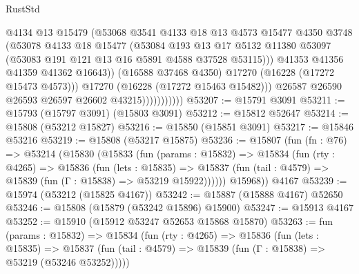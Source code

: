 \begin{lexlean}{RustStd}
\begin{coremodule}
                                @4134
                                @13
                                @15479
                                (@53068
                                  @3541
                                  @4133
                                  @18
                                  @13
                                  @4573
                                  @15477
                                  @4350
                                  @3748
                                  (@53078
                                    @4133
                                    @18
                                    @15477
                                    (@53084
                                      @193
                                      @13
                                      @17
                                      @5132
                                      @11380
                                      @53097
                                      (@53083 @191 @121 @13 @16 @5891 @4588 @37528 @53115)))
                                  @41353
                                  @41356
                                  @41359
                                  @41362
                                  @16643))
                              (@16588 @37468 @4350)
                              @17270
                              (@16228 (@17272 @15473 @4573)))
                            @17270
                            (@16228 (@17272 @15463 @15482)))
                          @26587
                          @26590
                          @26593
                          @26597
                          @26602
                          @43215)))))))))))
@53207 := @15791 @3091
@53211 := @15793 (@15797 @3091) (@15803 @3091)
@53212 := @15812 @52647
@53214 := @15808 (@53212 @15827)
@53216 := @15850 (@15851 @3091)
@53217 := @15846 @53216
@53219 := @15808 (@53217 @15875)
@53236 := @15807
    (fun (fn : @76) =>
    @53214
      (@15830
        (@15833
          (fun (params : @15832) =>
          @15834
            (fun (rty : @4265) =>
            @15836
              (fun (lets : @15835) =>
              @15837 (fun (tail : @4579) => @15839 (fun (Γ : @15838) => @53219 @15922))))))
        @15968))
    @4167
@53239 := @15974 (@53212 (@15825 @4167))
@53242 := @15887 (@15888 @4167) @52650
@53246 := @15808 (@15879 (@53242 @15896) @15900)
@53247 := @15913 @4167
@53252 := @15910 (@15912 @53247 @52653 @15868 @15870)
@53263 := fun (params : @15832) =>
  @15834
    (fun (rty : @4265) =>
    @15836
      (fun (lets : @15835) =>
      @15837 (fun (tail : @4579) => @15839 (fun (Γ : @15838) => @53219 (@53246 @53252)))))

\end{coremodule}
\end{lexlean}
